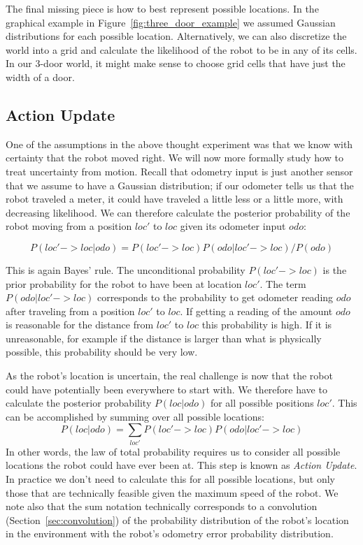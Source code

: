 The final missing piece is how to best represent possible locations. In the graphical example in Figure~\ref{fig:three_door_example} we assumed Gaussian distributions for each possible location. Alternatively, we can also discretize the world into a grid and calculate the likelihood of the robot to be in any of its cells. In our 3-door world, it might make sense to choose grid cells that have just the width of a door.

\subsection{Action Update}
One of the assumptions in the above thought experiment was that we know with certainty that the robot moved right. We will now more formally study how to treat uncertainty from motion. Recall that odometry input is just another sensor that we assume to have a Gaussian distribution; if our odometer tells us that the robot traveled a meter, it could have traveled a  little less or a little more, with decreasing likelihood. We can therefore calculate the posterior probability of the robot moving from a position $loc'$ to $loc$ given its odometer input $odo$:

\begin{equation}
P(loc'->loc|odo)=P(loc'->loc)P(odo|loc'->loc)/P(odo)
\end{equation}

This is again Bayes' rule. The unconditional probability $P(loc'->loc)$ is the prior probability for the robot to have been at location $loc'$. The term $ P(odo|loc'->loc)$ corresponds to the probability to get odometer reading $odo$ after traveling from a position $loc'$ to $loc$. If getting a reading of the amount $odo$ is reasonable for the distance from $loc'$ to $loc$ this probability is high. If it is unreasonable, for example if the distance is larger than what is physically possible, this probability should be very low.

As the robot's location is uncertain, the real challenge is now that the robot could have potentially been everywhere to start with. We therefore have to calculate the posterior probability $P(loc|odo)$ for all possible positions $loc'$. This can be accomplished by summing over all possible locations:
\begin{equation}
P(loc|odo)=\sum_{loc'}P(loc'->loc)P(odo|loc'->loc)
\end{equation}
In other words, the law of total probability requires us to consider all possible locations the robot could have ever been at. This step is known as \emph{Action Update}. In practice we don't need to calculate this for all possible locations, but only those that are technically feasible given the maximum speed of the robot. We note also that the sum notation technically corresponds to a convolution (Section~\ref{sec:convolution}) of the probability distribution of the robot's location in the environment with the robot's odometry error probability distribution.

